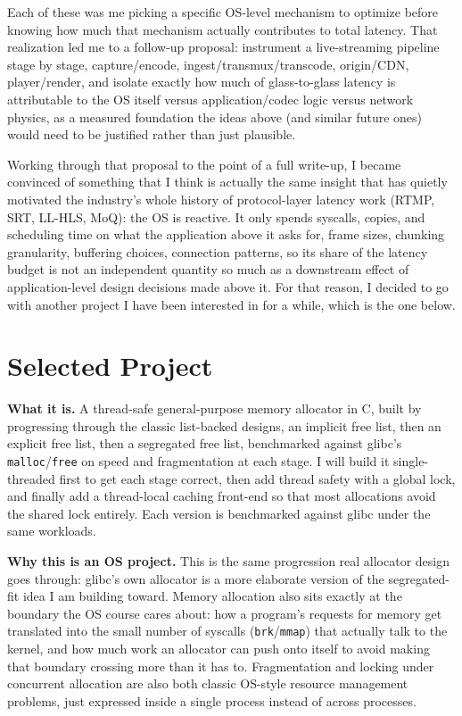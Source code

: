 \documentclass[12pt,letterpaper]{article}
\begin{document}
Each of these was me picking a specific OS-level mechanism to optimize before knowing how much that mechanism actually contributes to total latency. That realization led me to a follow-up proposal: instrument a live-streaming pipeline stage by stage, capture/encode, ingest/transmux/transcode, origin/CDN, player/render, and isolate exactly how much of glass-to-glass latency is attributable to the OS itself versus application/codec logic versus network physics, as a measured foundation the ideas above (and similar future ones) would need to be justified rather than just plausible.

Working through that proposal to the point of a full write-up, I became convinced of something that I think is actually the same insight that has quietly motivated the industry's whole history of protocol-layer latency work (RTMP, SRT, LL-HLS, MoQ): the OS is reactive. It only spends syscalls, copies, and scheduling time on what the application above it asks for, frame sizes, chunking granularity, buffering choices, connection patterns, so its share of the latency budget is not an independent quantity so much as a downstream effect of application-level design decisions made above it. For that reason, I decided to go with another project I have been interested in for a while, which is the one below.

\section*{Selected Project}

\textbf{What it is.} A thread-safe general-purpose memory allocator in C, built by progressing through the classic list-backed designs, an implicit free list, then an explicit free list, then a segregated free list, benchmarked against glibc's \texttt{malloc}/\texttt{free} on speed and fragmentation at each stage. I will build it single-threaded first to get each stage correct, then add thread safety with a global lock, and finally add a thread-local caching front-end so that most allocations avoid the shared lock entirely. Each version is benchmarked against glibc under the same workloads.

\textbf{Why this is an OS project.} This is the same progression real allocator design goes through: glibc's own allocator is a more elaborate version of the segregated-fit idea I am building toward. Memory allocation also sits exactly at the boundary the OS course cares about: how a program's requests for memory get translated into the small number of syscalls (\texttt{brk}/\texttt{mmap}) that actually talk to the kernel, and how much work an allocator can push onto itself to avoid making that boundary crossing more than it has to. Fragmentation and locking under concurrent allocation are also both classic OS-style resource management problems, just expressed inside a single process instead of across processes.
\end{document}
